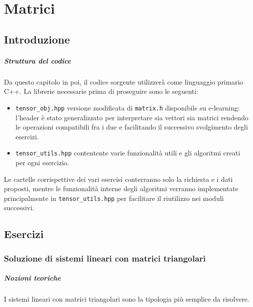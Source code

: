 \setchapterpreamble[u]{\margintoc}
\chapter{Matrici}

\section{Introduzione}

\paragraph{Struttura del codice}

Da questo capitolo in poi, il codice sorgente utilizzerà come linguaggio primario
C++. La librerie necessarie prima di proseguire sono le seguenti:

\begin{itemize}
	\item \texttt{tensor\_obj.hpp} versione modificata di \texttt{matrix.h} disponibile
	      su e-learning: l'header è stato generalizzato per interpretare sia
	      vettori sia matrici rendendo le operazioni compatibili fra i due e
	      facilitando il successivo svolgimento degli esercizi.
	\item \texttt{tensor\_utils.hpp} contentente varie funzionalità utili e 
	      gli algoritmi creati per ogni esercizio.
\end{itemize}

Le cartelle corrispettive dei vari esercisi conterranno solo la richiesta e i dati
proposti, mentre le funzionalità interne degli algoritmi verranno implementate
principalmente in \texttt{tensor\_utils.hpp} per facilitare il riutilizzo nei moduli
successivi.

\section{Esercizi}

\subsection{Soluzione di sistemi lineari con matrici triangolari}

\paragraph{Nozioni teoriche}

I sistemi lineari con matrici triangolari sono la tipologia più semplice da risolvere.

